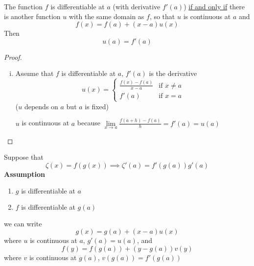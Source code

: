\begin{theorem*}
  The function $f$ is differentiable at $a$ (with derivative $f'(a)$) \underline{if and only if} 
  there is another function $u$ with the same domain as $f$, 
  so that $u$ is continuous at $a$ and $$f(x) = f(a) + (x-a)u(x)$$
  Then $$u(a) = f'(a)$$

\end{theorem*}

\begin{proof}
  \text{}
  \begin{enumerate}[(i)]
    \item Assume that $f$ is differentiable at $a$, $f'(a)$ is the derivative
  \[
    u(x) = \begin{cases}
      \frac{f(x) - f(a)}{x-a} & \text{if } x \neq a \\
      f'(a) & \text{if } x = a
    \end{cases} 
  \]
  ($u$ depends on $a$ but $a$ is fixed)

  $u$ is continuous at $a$ because $\lim\limits_{x \to a} \frac{f(a+h) - f(a)}{h} = f'(a) = u(a)$
  
  





  \end{enumerate}

\end{proof}

Suppose that $$\zeta(x) = f(g(x)) \implies \zeta'(a) = f'(g(a))g'(a)$$
\textbf{Assumption}
\begin{enumerate}[(1)]
  \item $g$ is differentiable at $a$
  \item $f$ is differentiable at $g(a)$
\end{enumerate}
we can write 
$$g(x) = g(a) + (x-a)u(x)$$
where $u$ is continuous at $a$, $g'(a) = u(a)$, and
$$f(y) = f(g(a)) + (y - g(a))v(y)$$
where $v$ is continuous at $g(a)$, $v(g(a)) = f'(g(a))$

